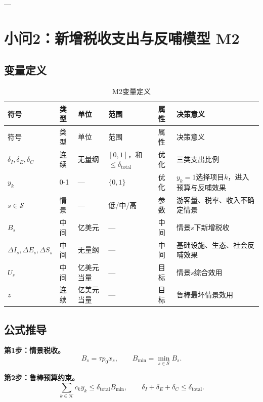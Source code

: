 \documentclass[UTF8,a4paper,12pt]{ctexart}
\begin{document}
---

\section{小问2：新增税收支出与反哺模型 M2}

\subsection{变量定义}

\begin{longtable}{@{}p{1.5cm}p{1.3cm}p{1.1cm}p{2.2cm}p{1.2cm}p{5.1cm}@{}}
\caption{M2变量定义}\\
\toprule
符号 & 类型 & 单位 & 范围 & 属性 & 决策意义\\
\midrule
\endfirsthead
\toprule
符号 & 类型 & 单位 & 范围 & 属性 & 决策意义\\
\midrule
\endhead
\(\delta_I,\delta_E,\delta_C\) & 连续 & 无量纲 & \([0,1]\)，和\(\le\delta_{\mathrm{total}}\) & 优化 & 三类支出比例\\
\(y_k\) & 0-1 & — & \(\{0,1\}\) & 优化 & \(y_k=1\)选择项目\(k\)，进入预算与反哺效果\\
\(s\in\mathcal S\) & 情景 & — & 低/中/高 & 参数 & 游客量、税率、收入不确定情景\\
\(B_s\) & 中间 & 亿美元 & — & 中间 & 情景\(s\)下新增税收\\
\(\Delta I_s,\Delta E_s,\Delta S_s\) & 中间 & 无量纲 & — & 中间 & 基础设施、生态、社会反哺效果\\
\(U_s\) & 中间 & 亿美元当量 & — & 目标 & 情景\(s\)综合效用\\
\(z\) & 连续 & 亿美元当量 & — & 目标 & 鲁棒最坏情景效用\\
\bottomrule
\end{longtable}

\subsection{公式推导}

\textbf{第1步：情景税收。}
\begin{equation}\tag{M2-1}
B_s=\tau p_0x_s,\qquad B_{\min}=\min_{s\in\mathcal S}B_s.
\end{equation}

\textbf{第2步：鲁棒预算约束。}
\begin{equation}\tag{M2-2}
\sum_{k\in\mathcal K}c_ky_k\le\delta_{\mathrm{total}}B_{\min},\qquad \delta_I+\delta_E+\delta_C\le\delta_{\mathrm{total}}.
\end{equation}
\end{document}
